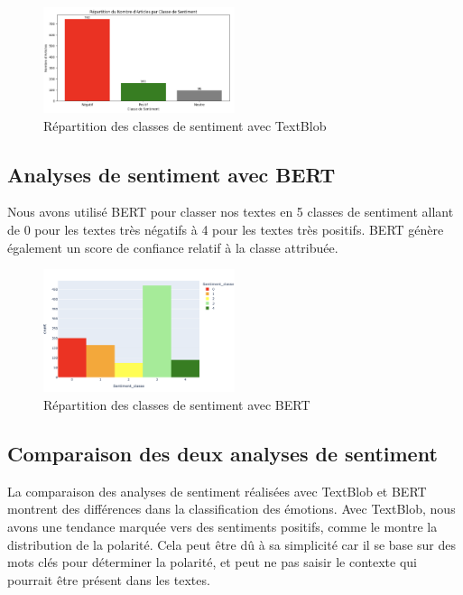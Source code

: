 \documentclass{article}
\begin{document}
\begin{figure}[!htbp]
    \centering
    \includegraphics[width=0.5\textwidth]{repartition_textBlob.png}
    \caption{Répartition des classes de sentiment avec TextBlob}
    \label{fig:plots}
\end{figure}

\subsection{Analyses de sentiment avec BERT}
Nous avons utilisé BERT pour classer nos textes en 5 classes de sentiment allant de 0 pour les textes très négatifs à 4 pour les textes très positifs. BERT génère également un score de confiance relatif à la classe attribuée.

\begin{figure}[!htbp]
    \centering
    \includegraphics[width=0.5\textwidth]{repartition_bert.png}
    \caption{Répartition des classes de sentiment avec BERT}
    \label{fig:plots}
\end{figure}
\vspace{-0.4cm}

\subsection{Comparaison des deux analyses de sentiment}
La comparaison des analyses de sentiment réalisées avec TextBlob et BERT montrent des différences dans la classification des émotions. Avec TextBlob, nous avons une tendance marquée vers des sentiments positifs, comme le montre la distribution de la polarité. Cela peut être dû à sa simplicité car il se base sur des mots clés pour déterminer la polarité, et peut ne pas saisir le contexte qui pourrait être présent dans les textes.\\
\end{document}
